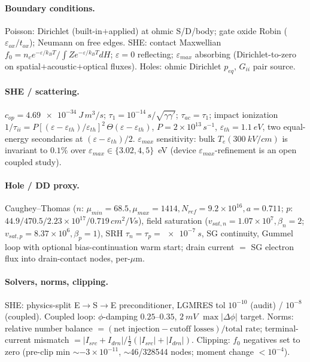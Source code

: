 \documentclass[11pt]{article}
\newcommand{\eps}{\varepsilon}
\begin{document}
\paragraph{Boundary conditions.} Poisson: Dirichlet (built-in$+$applied) at ohmic S/D/body; gate
oxide Robin ($\eps_{ox}/t_{ox}$); Neumann on free edges. SHE: contact Maxwellian
$f_0=n_c e^{-\eps/k_BT}/\!\int Z e^{-\eps/k_BT}dH$; $\eps{=}0$ reflecting; $\eps_{max}$ absorbing
(Dirichlet-to-zero on spatial$+$acoustic$+$optical fluxes). Holes: ohmic Dirichlet $p_{eq}$,
$G_{ii}$ pair source.

\paragraph{SHE / scattering.} $c_{op}=\SI{4.69e-34}{J\,m^3/s}$;
$\tau_1=10^{-14}\,\si{s}/\sqrt{\gamma\gamma'}$; $\tau_{ac}=\tau_1$; impact ionization
$1/\tau_{ii}=P[(\eps-\eps_{th})/\eps_{th}]^2\,\Theta(\eps-\eps_{th})$,
$P=2\times10^{13}\,\si{s^{-1}}$, $\eps_{th}=\SI{1.1}{eV}$, two equal-energy secondaries at
$(\eps-\eps_{th})/2$. $\eps_{max}$ sensitivity: bulk $T_e(\SI{300}{kV/cm})$ is invariant to $0.1\%$
over $\eps_{max}\in\{3.02,4,5\}$~eV (device $\eps_{max}$-refinement is an open coupled study).

\paragraph{Hole / DD proxy.} Caughey--Thomas ($n$: $\mu_{min}{=}68.5,\mu_{max}{=}1414,
N_{ref}{=}9.2{\times}10^{16},a{=}0.711$; $p$: $44.9/470.5/2.23{\times}10^{17}/0.719\,\si{cm^2/Vs}$),
field saturation ($v_{sat,n}{=}1.07{\times}10^{7},\beta_n{=}2$; $v_{sat,p}{=}8.37{\times}10^{6},
\beta_p{=}1$), SRH $\tau_n{=}\tau_p{=}\SI{e-7}{s}$, SG continuity, Gummel loop with optional
bias-continuation warm start; drain current $=$ SG electron flux into drain-contact nodes, per-$\mu$m.

\paragraph{Solvers, norms, clipping.} SHE: physics-split E$\to$S$\to$E preconditioner, LGMRES tol
$10^{-10}$ (audit) / $10^{-8}$ (coupled). Coupled loop: $\phi$-damping $0.25$--$0.35$, $\SI{2}{mV}$
$\max|\Delta\phi|$ target. Norms: relative number balance $=(\text{net injection}-\text{cutoff
losses})/\text{total rate}$; terminal-current mismatch $=|I_{src}{+}I_{drn}|/\tfrac12(|I_{src}|{+}
|I_{drn}|)$. Clipping: $f_0$ negatives set to zero (pre-clip min $\sim-3\times10^{-11}$,
$\sim$46/328544 nodes; moment change $<10^{-4}$).
\end{document}
